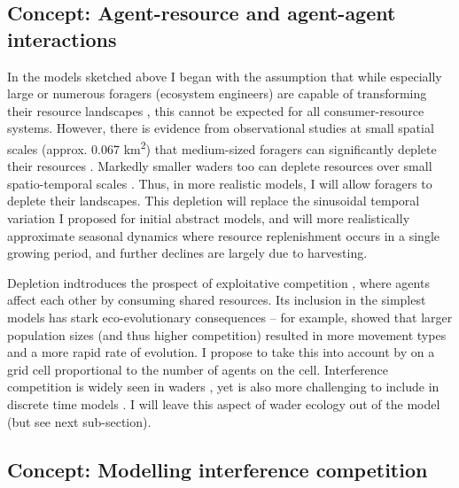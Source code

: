 \subsection{Concept: Agent-resource and agent-agent interactions}

In the models sketched above I began with the assumption that while especially large or numerous foragers (ecosystem engineers) are capable of transforming their resource landscapes \citep{laundre2001, jefferies2006, leroux2018}, this cannot be expected for all consumer-resource systems. However, there is evidence from observational studies at small spatial scales (approx. 0.067 km\textsuperscript{2}) that medium-sized foragers can significantly deplete their resources \citep{guillemette1996, jefferies2006}. Markedly smaller waders too can deplete resources over small spatio-temporal scales \citep{szekely1992, vangils2003, bijleveld2015c}. Thus, in more realistic models, I will allow foragers to deplete their landscapes. This depletion will replace the sinusoidal temporal variation I proposed for initial abstract models, and will more realistically approximate seasonal dynamics where resource replenishment occurs in a single growing period, and further declines are largely due to harvesting.

Depletion indtroduces the prospect of exploitative competition \citep{keddy2001}, where agents affect each other by consuming shared resources. Its inclusion in the simplest models has stark eco-evolutionary consequences -- for example, \citet{getz2015} showed that larger population sizes (and thus higher competition) resulted in more movement types and a more rapid rate of evolution. I propose to take this into account by on a grid cell proportional to the number of agents on the cell. Interference competition is widely seen in waders \citep{goss-custard1980}, yet is also more challenging to include in discrete time models \citep{vahl2006}. I will leave this aspect of wader ecology out of the model (but see next sub-section).

\subsection{Concept: Modelling interference competition}

